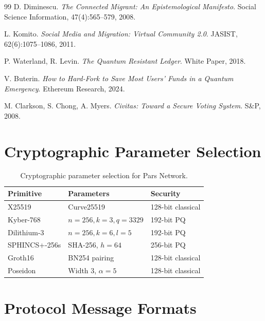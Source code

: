 \documentclass[11pt,a4paper,twocolumn]{article}
\begin{document}
\begin{thebibliography}{99}
D. Diminescu. \emph{The Connected Migrant: An Epistemological Manifesto}. Social Science Information, 47(4):565--579, 2008.

L. Komito. \emph{Social Media and Migration: Virtual Community 2.0}. JASIST, 62(6):1075--1086, 2011.

P. Waterland, R. Levin. \emph{The Quantum Resistant Ledger}. White Paper, 2018.

V. Buterin. \emph{How to Hard-Fork to Save Most Users' Funds in a Quantum Emergency}. Ethereum Research, 2024.

M. Clarkson, S. Chong, A. Myers. \emph{Civitas: Toward a Secure Voting System}. S\&P, 2008.

\end{thebibliography}

\appendix

\section{Cryptographic Parameter Selection}
\label{app:params}

\begin{table}[H]
\centering
\caption{Cryptographic parameter selection for Pars Network.}
\begin{tabularx}{\columnwidth}{lXl}
\toprule
\textbf{Primitive} & \textbf{Parameters} & \textbf{Security} \\
\midrule
X25519 & Curve25519 & 128-bit classical \\
Kyber-768 & $n=256, k=3, q=3329$ & 192-bit PQ \\
Dilithium-3 & $n=256, k=6, l=5$ & 192-bit PQ \\
SPHINCS+-256s & SHA-256, $h=64$ & 256-bit PQ \\
Groth16 & BN254 pairing & 128-bit classical \\
Poseidon & Width 3, $\alpha=5$ & 128-bit classical \\
\bottomrule
\end{tabularx}
\end{table}

\section{Protocol Message Formats}
\label{app:messages}
\end{document}
